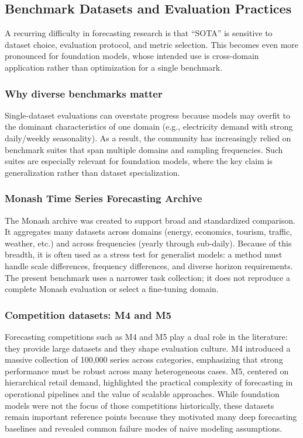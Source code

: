 \subsection{Benchmark Datasets and Evaluation Practices}

A recurring difficulty in forecasting research is that ``SOTA'' is sensitive to dataset choice, evaluation protocol, and metric selection. This becomes even more pronounced for foundation models, whose intended use is cross-domain application rather than optimization for a single benchmark.

\subsubsection{Why diverse benchmarks matter}
Single-dataset evaluations can overstate progress because models may overfit to the dominant characteristics of one domain (e.g., electricity demand with strong daily/weekly seasonality). As a result, the community has increasingly relied on benchmark suites that span multiple domains and sampling frequencies. Such suites are especially relevant for foundation models, where the key claim is generalization rather than dataset specialization.

\subsubsection{Monash Time Series Forecasting Archive}
The Monash archive was created to support broad and standardized comparison. It aggregates many datasets across domains (energy, economics, tourism, traffic, weather, etc.) and across frequencies (yearly through sub-daily). Because of this breadth, it is often used as a stress test for generalist models: a method must handle scale differences, frequency differences, and diverse horizon requirements. The present benchmark uses a narrower task collection; it does not reproduce a complete Monash evaluation or select a fine-tuning domain.

\subsubsection{Competition datasets: M4 and M5}
Forecasting competitions such as M4 and M5 play a dual role in the literature: they provide large datasets and they shape evaluation culture. M4 introduced a massive collection of 100{,}000 series across categories, emphasizing that strong performance must be robust across many heterogeneous cases. M5, centered on hierarchical retail demand, highlighted the practical complexity of forecasting in operational pipelines and the value of scalable approaches. While foundation models were not the focus of those competitions historically, these datasets remain important reference points because they motivated many deep forecasting baselines and revealed common failure modes of naive modeling assumptions.

